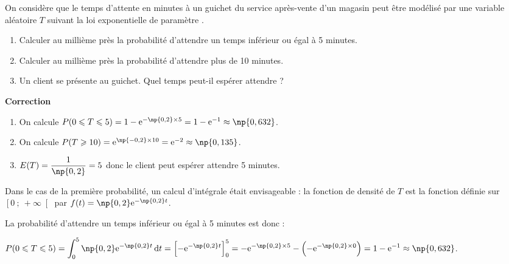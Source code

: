 \documentclass{cornouaille}
\begin{document}
\begin{methode}
\exercice
On considère que le temps d'attente en minutes à un guichet du service après-vente d'un magasin peut être modélisé par une variable aléatoire $T$ suivant la loi exponentielle de paramètre .
\begin{enumerate}
\item Calculer au millième près la probabilité d'attendre un temps inférieur ou égal à 5 minutes.
\item Calculer au millième près la probabilité d'attendre plus de 10 minutes.
\item Un client se présente au guichet. Quel temps peut-il \og espérer \fg{} attendre ?
\end{enumerate}

\textbf{Correction}

\begin{enumerate}
\item On calcule $P(0\leqslant T \leqslant 5)=1-\textrm{e}^{-\np{0,2}\times 5}=1-\textrm{e}^{-1}\approx \np{0,632}$.
\item On calcule $P(T \geqslant 10)=\textrm{e}^{\np{-0,2} \times 10}=\textrm{e}^{-2}\approx \np{0,135}$.
\item $E(T)=\dfrac{1}{\np{0,2}}=5$ donc le client peut espérer attendre 5 minutes.
\end{enumerate}


\end{methode}



\begin{remarque}
Dans le cas de la première probabilité, un calcul d'intégrale était envisageable : la fonction de densité de $T$ est la fonction définie sur $\left[0\ ;\ +\infty \right[$ par $f(t)=\np{0,2}\textrm{e}^{-\np{0,2}t}$.

La probabilité d'attendre un temps inférieur ou égal à 5 minutes est donc :

 $P(0\leqslant T \leqslant 5)=\displaystyle \int_{0}^{5} \np{0,2}\textrm{e}^{-\np{0,2}t} \, \textrm{d}t=\left[-\textrm{e}^{-\np{0,2}t}\right]_{0}^{5}=-\textrm{e}^{-\np{0,2}\times5}-\left(-\textrm{e}^{-\np{0,2}\times0}\right)=1-\textrm{e}^{-1}\approx \np{0,632}$.
\end{remarque}
\end{document}
